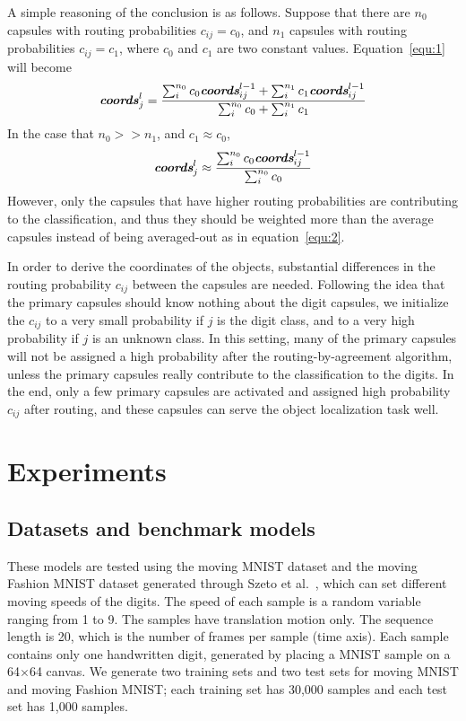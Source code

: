 \documentclass{article}
\begin{document}
A simple reasoning of the conclusion is as follows. Suppose that there are $n_0$ capsules with routing probabilities $c_{ij}=c_{0}$, and $n_1$ capsules with routing probabilities $c_{ij} = c_{1}$, where $c_0$ and $c_1$ are two constant values. Equation~\ref{equ:1} will become 
\begin{equation}
\textbf{\textit{coords}}_{j}^{l} = \frac{\sum_{i}^{n_0}c_{0}\textit{\textbf{coords}}_{ij}^{l-1}+\sum_{i}^{n_1}c_{1}\textit{\textbf{coords}}_{ij}^{l-1}}{\sum_{i}^{n_0}c_{0} + \sum_{i}^{n_1}c_{1}}
\end{equation}
In the case that $n_0 >> n_1$, and $c_1\approx c_0$,
\begin{equation} \label{equ:2}
\textit{\textbf{coords}}_{j}^{l} \approx \frac{\sum_{i}^{n_0}c_{0}\textit{\textbf{coords}}_{ij}^{l-1}}{\sum_{i}^{n_0}c_{0}}
\end{equation}
However, only the capsules that have higher routing probabilities are contributing to the classification, and thus they should be weighted more than the average capsules instead of being averaged-out as in equation~\ref{equ:2}.

In order to derive the coordinates of the objects, substantial differences in the routing probability $c_{ij}$ between the capsules are needed. Following the idea that the primary capsules should know nothing about the digit capsules, we initialize the $c_{ij}$ to a very small probability if $j$ is the digit class, and to a very high probability if $j$ is an unknown class. In this setting, many of the primary capsules will not be assigned a high probability after the routing-by-agreement algorithm, unless the primary capsules really contribute to the classification to the digits. In the end, only a few primary capsules are activated and assigned high probability $c_{ij}$ after routing, and these capsules can serve the object localization task well. 

\section{Experiments}
\subsection{Datasets and benchmark models}
These models are tested using the moving MNIST dataset and the moving Fashion MNIST dataset generated through Szeto et al.~\cite{szeto2018dataset}, which can set different moving speeds of the digits. The speed of each sample is a random variable ranging from 1 to 9. The samples have translation motion only. The sequence length is 20, which is the number of frames per sample (time axis). Each sample contains only one handwritten digit, generated by placing a MNIST sample on a 64$\times$64 canvas. We generate two training sets and two test sets for moving MNIST and moving Fashion MNIST; each training set has 30,000 samples and each test set has 1,000 samples. 
\end{document}
